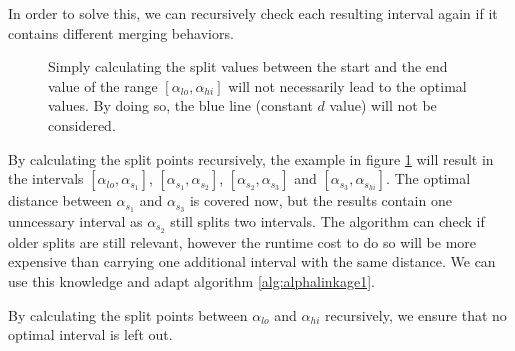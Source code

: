 In order to solve this, we can recursively check each resulting interval again if it contains different merging behaviors.

\begin{figure}[H]
    \centering
    \caption{Simply calculating the split values between the start and the end value of the range $[\alpha_{lo}, \alpha_{hi}]$ will not necessarily lead to the optimal values. By doing so, the blue line (constant $d$ value) will not be considered.}
    \label{fig:notoptimal2}
\end{figure}

By calculating the split points recursively, the example in figure \ref{fig:notoptimal2} will result in the intervals $[\alpha_{lo}, \alpha_{s_1}]$, $[\alpha_{s_1}, \alpha_{s_2}]$, $[\alpha_{s_2}, \alpha_{s_3}]$ and $[\alpha_{s_3}, \alpha_{s_{hi}}]$. The optimal distance between $\alpha_{s_1}$ and $\alpha_{s_3}$ is covered now, but the results contain one unncessary interval as $\alpha_{s_2}$ still splits two intervals. The algorithm can check if older splits are still relevant, however the runtime cost to do so will be more expensive than carrying one additional interval with the same distance. We can use this knowledge and adapt algorithm \ref{alg:alphalinkage1}.

\begin{algorithm}[H]
    \caption{By calculating the split points between $\alpha_{lo}$ and $\alpha_{hi}$ recursively, we ensure that no optimal interval is left out.}
    \label{alg:alphalinkage2}
\end{algorithm}

